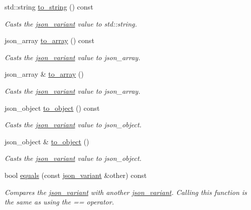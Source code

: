 \begin{DoxyCompactItemize}
std\+::string \hyperlink{classJSONLIB__NAMESPACE_1_1json__variant_a6bbb59173d134b69cded2d3da3a1b70f}{to\+\_\+string} () const
\begin{DoxyCompactList}\small\item\em Casts the \hyperlink{classJSONLIB__NAMESPACE_1_1json__variant}{json\+\_\+variant} value to {\itshape std\+::string}. \end{DoxyCompactList}\item 
json\+\_\+array \hyperlink{classJSONLIB__NAMESPACE_1_1json__variant_a9c7e9d81370ff98393d2fd3ee00d013a}{to\+\_\+array} () const
\begin{DoxyCompactList}\small\item\em Casts the \hyperlink{classJSONLIB__NAMESPACE_1_1json__variant}{json\+\_\+variant} value to {\itshape json\+\_\+array}. \end{DoxyCompactList}\item 
json\+\_\+array \& \hyperlink{classJSONLIB__NAMESPACE_1_1json__variant_acda05aeecb0977c0b7555e5874cb61ee}{to\+\_\+array} ()
\begin{DoxyCompactList}\small\item\em Casts the \hyperlink{classJSONLIB__NAMESPACE_1_1json__variant}{json\+\_\+variant} value to {\itshape json\+\_\+array}. \end{DoxyCompactList}\item 
json\+\_\+object \hyperlink{classJSONLIB__NAMESPACE_1_1json__variant_a28035668bca7e7829340fe994581564d}{to\+\_\+object} () const
\begin{DoxyCompactList}\small\item\em Casts the \hyperlink{classJSONLIB__NAMESPACE_1_1json__variant}{json\+\_\+variant} value to {\itshape json\+\_\+object}. \end{DoxyCompactList}\item 
json\+\_\+object \& \hyperlink{classJSONLIB__NAMESPACE_1_1json__variant_aacc6999a4b2da8acd01d35cd33f3c5ea}{to\+\_\+object} ()
\begin{DoxyCompactList}\small\item\em Casts the \hyperlink{classJSONLIB__NAMESPACE_1_1json__variant}{json\+\_\+variant} value to {\itshape json\+\_\+object}. \end{DoxyCompactList}\item 
bool \hyperlink{classJSONLIB__NAMESPACE_1_1json__variant_ae68b9cb156c2b2f9e12c7f889634b63a}{equals} (const \hyperlink{classJSONLIB__NAMESPACE_1_1json__variant}{json\+\_\+variant} \&other) const
\begin{DoxyCompactList}\small\item\em Compares the \hyperlink{classJSONLIB__NAMESPACE_1_1json__variant}{json\+\_\+variant} with another \hyperlink{classJSONLIB__NAMESPACE_1_1json__variant}{json\+\_\+variant}. Calling this function is the same as using the {\itshape ==} {\itshape operator}. \end{DoxyCompactList}\item 

\end{DoxyCompactItemize}
